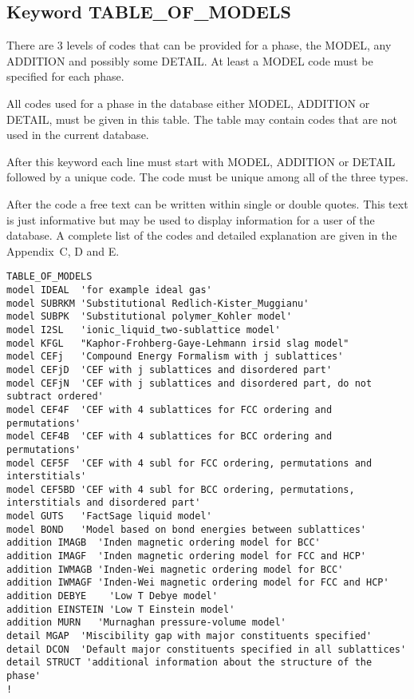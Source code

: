 \documentclass[12pt]{article}
\begin{document}
\subsection{Keyword TABLE\_OF\_MODELS}\label{sec:codes}

There are 3 levels of codes that can be provided for a phase, the
MODEL, any ADDITION and possibly some DETAIL.  At least a MODEL code
must be specified for each phase.

All codes used for a phase in the database either MODEL, ADDITION or
DETAIL, must be given in this table.  The table may contain codes
that are not used in the current database.

After this keyword each line must start with MODEL, ADDITION or DETAIL
followed by a unique code.  The code must be unique among all of the
three types.

After the code a free text can be written within single or double
quotes.  This text is just informative but may be used to display
information for a user of the database.  A complete list of the codes
and detailed explanation are given in the Appendix~C, D and E.

{\small
\begin{verbatim}
TABLE_OF_MODELS
model IDEAL  'for example ideal gas'
model SUBRKM 'Substitutional Redlich-Kister_Muggianu'
model SUBPK  'Substitutional polymer_Kohler model'
model I2SL   'ionic_liquid_two-sublattice model'
model KFGL   "Kaphor-Frohberg-Gaye-Lehmann irsid slag model"  
model CEFj   'Compound Energy Formalism with j sublattices'
model CEFjD  'CEF with j sublattices and disordered part'
model CEFjN  'CEF with j sublattices and disordered part, do not subtract ordered'
model CEF4F  'CEF with 4 sublattices for FCC ordering and permutations'
model CEF4B  'CEF with 4 sublattices for BCC ordering and permutations'
model CEF5F  'CEF with 4 subl for FCC ordering, permutations and interstitials'
model CEF5BD 'CEF with 4 subl for BCC ordering, permutations, interstitials and disordered part'
model GUTS   'FactSage liquid model'
model BOND   'Model based on bond energies between sublattices'
addition IMAGB  'Inden magnetic ordering model for BCC'
addition IMAGF  'Inden magnetic ordering model for FCC and HCP'
addition IWMAGB 'Inden-Wei magnetic ordering model for BCC'
addition IWMAGF 'Inden-Wei magnetic ordering model for FCC and HCP'
addition DEBYE    'Low T Debye model'
addition EINSTEIN 'Low T Einstein model'
addition MURN   'Murnaghan pressure-volume model'
detail MGAP  'Miscibility gap with major constituents specified'
detail DCON  'Default major constituents specified in all sublattices'
detail STRUCT 'additional information about the structure of the phase'
!
\end{verbatim}
}
\end{document}
